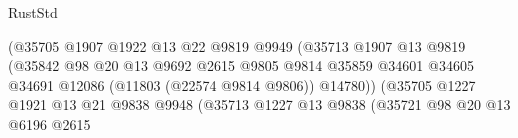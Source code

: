 \begin{lexlean}{RustStd}
\begin{coremodule}
                                                  (@35705
                                                    @1907
                                                    @1922
                                                    @13
                                                    @22
                                                    @9819
                                                    @9949
                                                    (@35713
                                                      @1907
                                                      @13
                                                      @9819
                                                      (@35842
                                                        @98
                                                        @20
                                                        @13
                                                        @9692
                                                        @2615
                                                        @9805
                                                        @9814
                                                        @35859
                                                        @34601
                                                        @34605
                                                        @34691
                                                        @12086
                                                        (@11803 (@22574 @9814 @9806))
                                                        @14780))
                                                    (@35705
                                                      @1227
                                                      @1921
                                                      @13
                                                      @21
                                                      @9838
                                                      @9948
                                                      (@35713
                                                        @1227
                                                        @13
                                                        @9838
                                                        (@35721
                                                          @98
                                                          @20
                                                          @13
                                                          @6196
                                                          @2615

\end{coremodule}
\end{lexlean}
